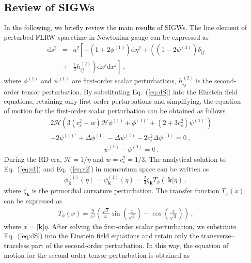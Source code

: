 \documentclass[reprint, 10pt, amsmath, amssymb, floatfix, aps, prd, superscriptaddress, nofootinbib, nobibnotes,twocolumn]{revtex4-1}
\begin{document}
\subsection{Review of \acp{SIGW}}
In the following, we briefly review the main results of \acp{SIGW}. The line element of perturbed \ac{FLRW} spacetime in Newtonian gauge can be expressed as
\cite{Malik:2008im}
\begin{eqnarray}\label{eq:dS}
	\mathrm{d} s^{2}&=&a^{2}\left[-\left(1+2 \phi^{(1)}\right) \mathrm{d} \eta^{2}+\left(\left(1-2 \psi^{(1)}\right) \delta_{i j} \right.\right.\nonumber\\
   &+&\left.\left.\frac{1}{2}h^{(2)}_{ij}\right)\mathrm{d} x^{i} \mathrm{d} x^{j}\right] \ ,
\end{eqnarray}
where $\phi^{(1)}$ and $\psi^{(1)}$ are first-order scalar perturbations, $h^{(2)}_{ij}$ is the second-order tensor perturbation. By substituting Eq.~(\ref{eq:dS}) into the Einstein field equations, retaining only first-order perturbations and simplifying, the equation of motion for the first-order scalar perturbation can be obtained as follows \cite{Ananda:2006af}
\begin{eqnarray}
&&2\mathcal{H} \left(3(c_s^2-w)\mathcal{H}\phi^{(1)}+\phi^{(1)'}+(2+3c_s^2)\psi^{(1)'}   \right)    \label{eq:s1} \nonumber\\
     &&+2\psi^{(1)''}+\Delta \phi^{(1)}-\Delta \psi^{(1)}-2c_s^2\Delta \psi^{(1)}=0 \ ,
\end{eqnarray}
\begin{eqnarray}
  &&\psi^{(1)}-\phi^{(1)}=0 \ . \label{eq:s2}
\end{eqnarray}
 During the \ac{RD} era, $\mathcal{H}=1/\eta$ and $w=c_s^2=1/3$. The analytical solution to Eq.~(\ref{eq:s1}) and Eq.~(\ref{eq:s2}) in momentum space can be written as 
\begin{eqnarray}\label{eq:T1}
    \phi^{(1)}_{\mathbf{k}}(\eta)=\psi^{(1)}_{\mathbf{k}}(\eta)=\frac{2}{3}\zeta_{\mathbf{k}} T_{\phi}(|\mathbf{k}| \eta) \ ,
\end{eqnarray}
where $\zeta_{\mathbf{k}}$ is the primordial curvature perturbation. The transfer function $T_\phi(x)$ can be expressed as \cite{Baumann:2007zm}
\begin{eqnarray}\label{eq:TRD}
    T_{\phi}(x)=\frac{9}{x^{2}}\left(\frac{\sqrt{3}}{x} \sin \left(\frac{x}{\sqrt{3}}\right)-\cos \left(\frac{x}{\sqrt{3}}\right)\right) \ ,
\end{eqnarray}
where $x=|\mathbf{k}|\eta$. After solving the first-order scalar perturbation, we substitute Eq.~(\ref{eq:dS}) into the Einstein field equations and retain only the transverse–traceless part of the second-order perturbation. In this way, the equation of motion for the second-order tensor perturbation is obtained as
\end{document}
